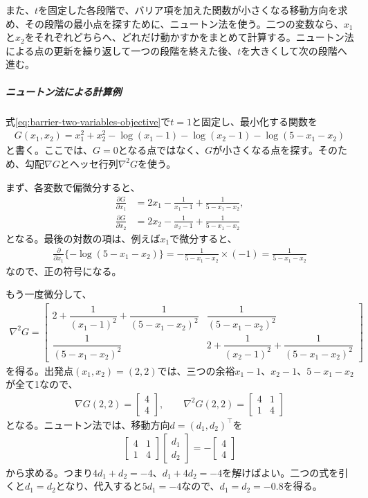 \documentclass[a4j]{jarticle}
\begin{document}
また、$t$を固定した各段階で、バリア項を加えた関数が小さくなる移動方向を求め、その段階の最小点を探すために、ニュートン法を使う。二つの変数なら、$x_1$と$x_2$をそれぞれどちらへ、どれだけ動かすかをまとめて計算する。ニュートン法による点の更新を繰り返して一つの段階を終えた後、$t$を大きくして次の段階へ進む。

\subparagraph{ニュートン法による計算例}
式\eqref{eq:barrier-two-variables-objective}で$t=1$と固定し、最小化する関数を
\begin{align}
  G(x_1,x_2)=x_1^2+x_2^2
  -\log(x_1-1)-\log(x_2-1)-\log(5-x_1-x_2)
\end{align}
と書く。ここでは、$G=0$となる点ではなく、$G$が小さくなる点を探す。そのため、勾配$\nabla G$とヘッセ行列$\nabla^2G$を使う。

まず、各変数で偏微分すると、
\begin{align}
  \frac{\partial G}{\partial x_1}
  &=2x_1-\frac1{x_1-1}+\frac1{5-x_1-x_2},\\
  \frac{\partial G}{\partial x_2}
  &=2x_2-\frac1{x_2-1}+\frac1{5-x_1-x_2}
\end{align}
となる。最後の対数の項は、例えば$x_1$で微分すると、
\begin{align}
  \frac{\partial}{\partial x_1}\{-\log(5-x_1-x_2)\}
  =-\frac1{5-x_1-x_2}\times(-1)
  =\frac1{5-x_1-x_2}
\end{align}
なので、正の符号になる。

もう一度微分して、
\begin{align}
  \nabla^2G=
  \begin{bmatrix}
    2+\dfrac1{(x_1-1)^2}+\dfrac1{(5-x_1-x_2)^2}
    &\dfrac1{(5-x_1-x_2)^2}\\[1em]
    \dfrac1{(5-x_1-x_2)^2}
    &2+\dfrac1{(x_2-1)^2}+\dfrac1{(5-x_1-x_2)^2}
  \end{bmatrix}
\end{align}
を得る。出発点$(x_1,x_2)=(2,2)$では、三つの余裕$x_1-1$、$x_2-1$、$5-x_1-x_2$が全て1なので、
\begin{align}
  \nabla G(2,2)=\begin{bmatrix}4\\4\end{bmatrix},\qquad
  \nabla^2G(2,2)=\begin{bmatrix}4&1\\1&4\end{bmatrix}
\end{align}
となる。ニュートン法では、移動方向$d=(d_1,d_2)^\top$を
\begin{align}
  \begin{bmatrix}4&1\\1&4\end{bmatrix}
  \begin{bmatrix}d_1\\d_2\end{bmatrix}
  =-\begin{bmatrix}4\\4\end{bmatrix}
\end{align}
から求める。つまり$4d_1+d_2=-4$、$d_1+4d_2=-4$を解けばよい。二つの式を引くと$d_1=d_2$となり、代入すると$5d_1=-4$なので、$d_1=d_2=-0.8$を得る。
\end{document}
